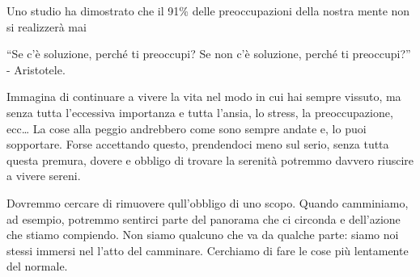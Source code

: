 \documentclass[12pt]{book} %
\begin{document}
Uno studio ha dimostrato che il 91\% delle preoccupazioni della nostra mente non si realizzerà
mai

“Se c'è soluzione, perché ti preoccupi? Se non c'è soluzione, perché ti preoccupi?” - Aristotele.

Immagina di continuare a vivere la vita nel modo in cui hai sempre vissuto, ma senza tutta l'eccessiva importanza e tutta l'ansia, lo stress, la preoccupazione, ecc… La cose alla peggio andrebbero come sono sempre andate e, lo puoi sopportare. Forse accettando questo, prendendoci meno sul serio, senza tutta questa premura, dovere e obbligo di trovare la serenità potremmo davvero riuscire a vivere sereni.

Dovremmo cercare di rimuovere qull'obbligo di uno scopo. Quando camminiamo, ad esempio, potremmo sentirci parte del panorama che ci circonda e dell'azione che stiamo compiendo.
Non siamo qualcuno che va da qualche parte: siamo noi stessi immersi nel l'atto del camminare. 
Cerchiamo di fare le cose più lentamente del normale.
\end{document}
